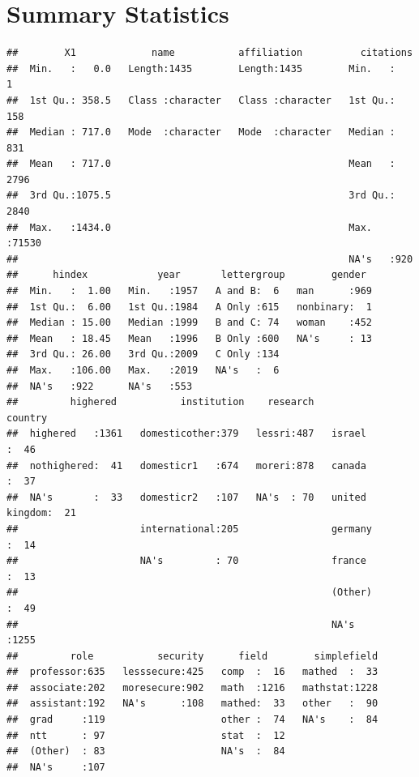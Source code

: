 \documentclass[]{article}
\begin{document}
\hypertarget{summary-statistics}{%
\section{Summary Statistics}\label{summary-statistics}}

\begin{verbatim}
##        X1             name           affiliation          citations    
##  Min.   :   0.0   Length:1435        Length:1435        Min.   :    1  
##  1st Qu.: 358.5   Class :character   Class :character   1st Qu.:  158  
##  Median : 717.0   Mode  :character   Mode  :character   Median :  831  
##  Mean   : 717.0                                         Mean   : 2796  
##  3rd Qu.:1075.5                                         3rd Qu.: 2840  
##  Max.   :1434.0                                         Max.   :71530  
##                                                         NA's   :920    
##      hindex            year       lettergroup        gender   
##  Min.   :  1.00   Min.   :1957   A and B:  6   man      :969  
##  1st Qu.:  6.00   1st Qu.:1984   A Only :615   nonbinary:  1  
##  Median : 15.00   Median :1999   B and C: 74   woman    :452  
##  Mean   : 18.45   Mean   :1996   B Only :600   NA's     : 13  
##  3rd Qu.: 26.00   3rd Qu.:2009   C Only :134                  
##  Max.   :106.00   Max.   :2019   NA's   :  6                  
##  NA's   :922      NA's   :553                                 
##         highered           institution    research             country    
##  highered   :1361   domesticother:379   lessri:487   israel        :  46  
##  nothighered:  41   domesticr1   :674   moreri:878   canada        :  37  
##  NA's       :  33   domesticr2   :107   NA's  : 70   united kingdom:  21  
##                     international:205                germany       :  14  
##                     NA's         : 70                france        :  13  
##                                                      (Other)       :  49  
##                                                      NA's          :1255  
##         role           security      field        simplefield  
##  professor:635   lesssecure:425   comp  :  16   mathed  :  33  
##  associate:202   moresecure:902   math  :1216   mathstat:1228  
##  assistant:192   NA's      :108   mathed:  33   other   :  90  
##  grad     :119                    other :  74   NA's    :  84  
##  ntt      : 97                    stat  :  12                  
##  (Other)  : 83                    NA's  :  84                  
##  NA's     :107                                                 

\end{verbatim}
\end{document}
